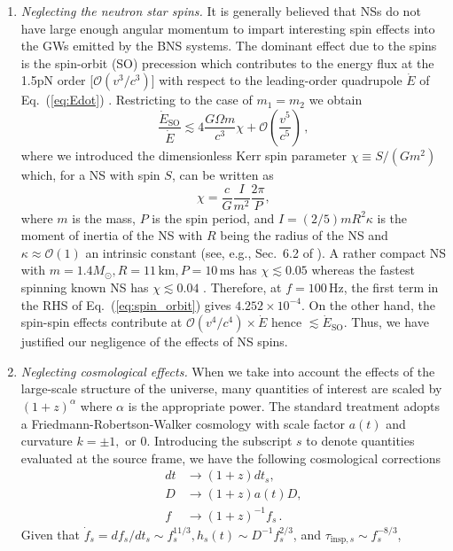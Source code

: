 \documentclass[amsmath,amssymb,aps,floats,amsfonts,notitlepage,superscriptaddress,eqsecnum,nofootinbib,10pt]{revtex4-1}
\newcommand{\ord}{\mathcal{O}}
\newcommand{\f}{\frac}
\newcommand{\be}{\begin{equation}}
\newcommand{\ee}{\end{equation}}
\begin{document}
\begin{enumerate}
%
\item {\it Neglecting the neutron star spins.}
It is generally believed that NSs do not have large enough angular momentum to impart interesting spin effects into the GWs emitted by the BNS systems.
The dominant effect due to the spins is the spin-orbit (SO) precession which contributes to the energy flux at the 1.5pN order [$\ord(v^3/c^3)$] with respect to the leading-order quadrupole $\dot{E}$ of Eq.~(\ref{eq:Edot}) \cite{Blanchet_LRR}. 
Restricting to the case of $m_1=m_2$ we obtain
%
\be
\f{\dot{E}_{\text{SO}}}{\dot{E}} \lesssim 4 \f{G\Omega m}{c^3}\chi + \ord\left(\f{v^5}{c^5}\right) \label{eq:spin_orbit}\, ,
\ee
%
where we introduced the dimensionless Kerr spin parameter $\chi\equiv {S}/({G m^2})$ which, for a NS with spin $S$, can be written as
%
\be
\chi=\f{c}{G} \f{I}{m^2} \f{2\pi}{P}, \label{eq:NS_spin}
\ee
%
where $m$ is the mass, $P$ is the spin period, and $ I = (2/5) m R^2 \kappa$ is the moment of inertia of the NS with $R$ being the radius of the NS and $\kappa \approx \ord(1)$ an intrinsic constant (see, e.g., Sec.~6.2 of \cite{Colpi_Sesana}). 
A rather compact NS with $m=1.4 M_\odot, R=11\,\text{km}, P= 10\,\text{ms}$ has $\chi\lesssim 0.05$ whereas
the fastest spinning known NS has $\chi\lesssim 0.04$ \cite{FastestNSspin}.
Therefore, at $f= 100\,$Hz, the first term in the RHS of Eq.~(\ref{eq:spin_orbit}) gives $4.252\times 10^{-4}$. 
On the other hand, the spin-spin effects contribute at $\ord(v^4/c^4)\times\dot{E}$ hence $\lesssim \dot{E}_\text{SO}$.
Thus, we have justified our negligence of the effects of NS spins.
%
\item {\it Neglecting cosmological effects.}
When we take into account the effects of the large-scale structure of the universe, many quantities of interest are scaled by $(1+z)^\alpha$ where $\alpha$
is the appropriate power. The standard treatment adopts a Friedmann-Robertson-Walker cosmology with scale factor $a(t)$ and curvature $k=\pm 1, \text{ or } 0$.
Introducing the subscript $s$ to denote quantities evaluated at the source frame, we have the following cosmological corrections
%
\begin{align}
dt& \rightarrow (1+z) dt_s, \\
 D & \rightarrow  (1+z)a(t) D,\\
 f & \rightarrow (1+z)^{-1} f_s\, .
\end{align}
%
Given that $\dot{f}_s=df_s/dt_s\sim f^{11/3}_s, h_s(t)\sim D^{-1} f_s^{2/3}$, and $\tau_{\text{insp},s}\sim f_s^{-8/3}$,

\end{enumerate}
\end{document}
